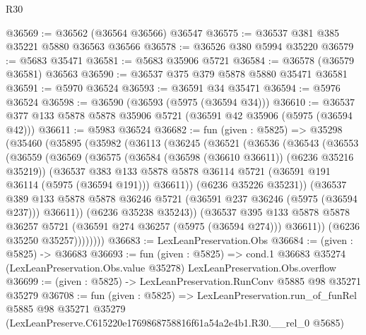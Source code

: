\begin{lexlean}{R30}
\begin{coremodule}
@36569 := @36562 (@36564 @36566) @36547
@36575 := @36537 @381 @385 @35221 @5880 @36563 @36566
@36578 := @36526 @380 @5994 @35220
@36579 := @5683 @35471
@36581 := @5683 @35906 @5721
@36584 := @36578 (@36579 @36581) @36563
@36590 := @36537 @375 @379 @5878 @5880 @35471 @36581
@36591 := @5970 @36524
@36593 := @36591 @34 @35471
@36594 := @5976 @36524
@36598 := @36590 (@36593 (@5975 (@36594 @34)))
@36610 := @36537 @377 @133 @5878 @5878 @35906 @5721 (@36591 @42 @35906 (@5975 (@36594 @42)))
@36611 := @5983 @36524
@36682 := fun (given : @5825) =>
  @35298
    (@35460
      (@35895
        (@35982
          (@36113
            (@36245
              (@36521
                (@36536
                  (@36543
                    (@36553
                      (@36559
                        (@36569
                          (@36575
                            (@36584 (@36598 (@36610 @36611)) (@6236 @35216 @35219))
                            (@36537
                              @383
                              @133
                              @5878
                              @5878
                              @36114
                              @5721
                              (@36591 @191 @36114 (@5975 (@36594 @191)))
                              @36611))
                          (@6236 @35226 @35231))
                        (@36537
                          @389
                          @133
                          @5878
                          @5878
                          @36246
                          @5721
                          (@36591 @237 @36246 (@5975 (@36594 @237)))
                          @36611))
                      (@6236 @35238 @35243))
                    (@36537
                      @395
                      @133
                      @5878
                      @5878
                      @36257
                      @5721
                      (@36591 @274 @36257 (@5975 (@36594 @274)))
                      @36611))
                  (@6236 @35250 @35257))))))))
@36683 := LexLeanPreservation.Obs
@36684 := (given : @5825) -> @36683
@36693 := fun (given : @5825) =>
  cond.{1} @36683 @35274 (LexLeanPreservation.Obs.value @35278) LexLeanPreservation.Obs.overflow
@36699 := (given : @5825) -> LexLeanPreservation.RunConv @5885 @98 @35271 @35279
@36708 := fun (given : @5825) =>
  LexLeanPreservation.run_of_funRel
    @5885
    @98
    @35271
    @35279
    (LexLeanPreserve.C615220e1769868758816f61a54a2e4b1.R30.__rel_0 @5685)
\end{coremodule}
\end{lexlean}

